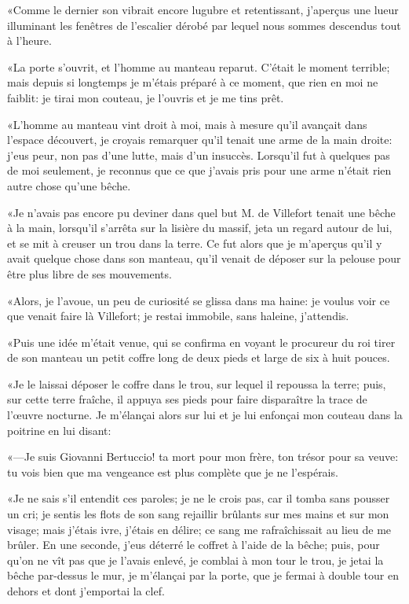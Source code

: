 «Comme le dernier son vibrait encore lugubre et retentissant, j'aperçus une lueur illuminant les fenêtres de l'escalier dérobé par lequel nous sommes descendus tout à l'heure. 

«La porte s'ouvrit, et l'homme au manteau reparut. C'était le moment terrible; mais depuis si longtemps je m'étais préparé à ce moment, que rien en moi ne faiblit: je tirai mon couteau, je l'ouvris et je me tins prêt. 

«L'homme au manteau vint droit à moi, mais à mesure qu'il avançait dans l'espace découvert, je croyais remarquer qu'il tenait une arme de la main droite: j'eus peur, non pas d'une lutte, mais d'un insuccès. Lorsqu'il fut à quelques pas de moi seulement, je reconnus que ce que j'avais pris pour une arme n'était rien autre chose qu'une bêche. 

«Je n'avais pas encore pu deviner dans quel but M. de Villefort tenait une bêche à la main, lorsqu'il s'arrêta sur la lisière du massif, jeta un regard autour de lui, et se mit à creuser un trou dans la terre. Ce fut alors que je m'aperçus qu'il y avait quelque chose dans son manteau, qu'il venait de déposer sur la pelouse pour être plus libre de ses mouvements. 

«Alors, je l'avoue, un peu de curiosité se glissa dans ma haine: je voulus voir ce que venait faire là Villefort; je restai immobile, sans haleine, j'attendis. 

«Puis une idée m'était venue, qui se confirma en voyant le procureur du roi tirer de son manteau un petit coffre long de deux pieds et large de six à huit pouces. 

«Je le laissai déposer le coffre dans le trou, sur lequel il repoussa la terre; puis, sur cette terre fraîche, il appuya ses pieds pour faire disparaître la trace de l'œuvre nocturne. Je m'élançai alors sur lui et je lui enfonçai mon couteau dans la poitrine en lui disant: 

«—Je suis Giovanni Bertuccio! ta mort pour mon frère, ton trésor pour sa veuve: tu vois bien que ma vengeance est plus complète que je ne l'espérais.  

«Je ne sais s'il entendit ces paroles; je ne le crois pas, car il tomba sans pousser un cri; je sentis les flots de son sang rejaillir brûlants sur mes mains et sur mon visage; mais j'étais ivre, j'étais en délire; ce sang me rafraîchissait au lieu de me brûler. En une seconde, j'eus déterré le coffret à l'aide de la bêche; puis, pour qu'on ne vît pas que je l'avais enlevé, je comblai à mon tour le trou, je jetai la bêche par-dessus le mur, je m'élançai par la porte, que je fermai à double tour en dehors et dont j'emportai la clef. 

